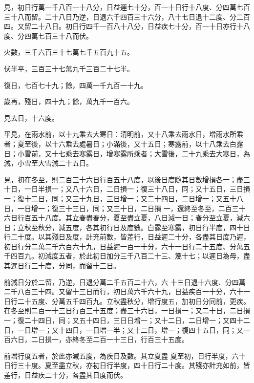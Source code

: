 \begin{pinyinscope}
 見，初日行萬一千八百一十八分，日益遲七十分，百一十日行十八度、分四萬七百三十八而留。二十八日乃逆，日退六千四百三十六分，八十七日退十二度、分二百四。又留二十八日。初日行四千一百八十八分，日益疾七十分，百一十日亦行十八度、分四萬七百三十八而伏。



 火數，三千六百三十七萬七千五百九十五。



 伏半平，三百三十七萬九千三百二十七半。



 復日，七百七十九；餘，四萬一千九百一十九。



 歲再，殘日，四十九；餘，萬九千一百六。



 見去日，十六度。



 平見，在雨水前，以十九乘去大寒日：清明前，又十八乘去雨水日，增雨水所乘者；夏至後，以十六乘去處暑日；小滿後，又十五日；寒露前，以十八乘去白露日；小雪前，又十七乘去寒露日，增寒露所乘者；大雪後，二十九乘去大寒日，為減，小雪至大雪減二十五日。



 見，初在冬至，則二百三十六日行百五十八度，以後日度隨其日數增損各一；盡三十日，一日半損一；又八十六日，二日損一；復三十八日，同；又十五日，三日損一；復十二日，同；又三十九日，三日增一；又二十四日，二日增一；又五十八日，一日增一；復三十三日，同；又三十日，二日損
 一，還終至冬至，二百三十六日行百五十八度。其立春盡春分，夏至盡立夏，八日減一日；春分至立夏，減六日；立秋至秋分，減五度，各其初行日及度數。白露至寒露，初日行半度，四十日行二十度。以其殘日及度，計充前數，皆差行，日益遲二十分，各盡其日度乃遲，初日行分二萬二千六百六十九，日益遲一百一十分，六十一日行二十五度、分萬五千四百九。初減度五者，於此初日加分三千八百二十三、篾十七；以遲日為母，盡其遲日行三十度，分同，而留十三日。



 前減日分於二留，乃逆，日退分萬二千五百二十六，六
 十三日退十六度、分四萬二千八百三十四。又留十三日而行，初日萬六千六十九，日益疾百一十分，六十一日行二十五度、分萬五千四百九。立秋盡秋分，增行度五，加初日分同前，更疾。在冬至則二百一十三日行百三十五度；盡三十六日，一日損一；又二十日，二日損一；復二十四日，同；又五十四日，三日日增一；又十二日，二日增一；又四十二日，一日增一；又十四日，一日增一半；又十二日，增一；復四十五日，同；又一百六日，二日損一，亦終冬至二百一十三日，行百三十五度。



 前增行度五者，於此亦減五度，為疾日及數。其立夏盡
 夏至初，日行半度，六十日行三十度。夏至盡立秋，亦初日行半度，四十日行二十度。其殘亦計充如前，皆差行，日益疾二十分，各盡其日度而伏。




\end{pinyinscope}
